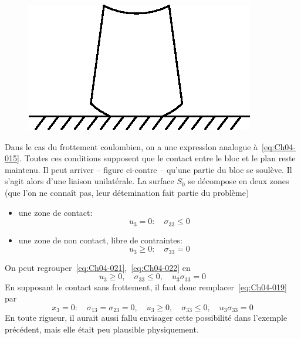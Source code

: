 \begin{figure}
    \begin{center}
        \includegraphics{../images/T1_Ch04-0005}
    \end{center}
\end{figure}
Dans le cas du frottement coulombien, on a une expresslon analogue à~\eqref{eq:Ch04-015}.
Toutes ces conditions supposent que le contact entre le bloc et le plan reste maintenu.
Il peut arriver -- figure ci-contre -- qu'une partie du bloc se soulève.
Il s'agit alors d'une liaison unilatérale.
La surface $S_0$ se décompose en deux zones (que l'on ne connaît pas, leur détemination fait partie du problème)
\begin{itemize}
    \item une zone de contact:
        \begin{equation}
            u_3 = 0: \quad \sigma_{33} \leq 0
            \label{eq:Ch04-021}
        \end{equation}
    \item une zone de non contact, libre de contraintes:
        \begin{equation}
            u_3 \geq 0: \quad \sigma_{33} = 0
            \label{eq:Ch04-022}
        \end{equation}
\end{itemize}
On peut regrouper~\eqref{eq:Ch04-021},~\eqref{eq:Ch04-022} en
\begin{equation}
    u_3 \geq 0, \quad \sigma_{33} \leq 0, \quad u_3 \sigma_{33} = 0
    \label{eq:Ch04-023}
\end{equation}
En supposant le contact sans frottement, il faut donc remplacer~\eqref{eq:Ch04-019} par
\begin{equation}
    x_3 = 0:\quad\sigma_{13} = \sigma_{23} = 0, \quad
        u_3 \geq 0, \quad \sigma_{33} \leq 0, \quad u_3 \sigma_{33} = 0
    \label{eq:Ch04-024}
\end{equation}
En toute rigueur, il aurait aussi fallu envisager cette possibilité dans l'exemple précédent, mais elle était peu plausible physiquement.

